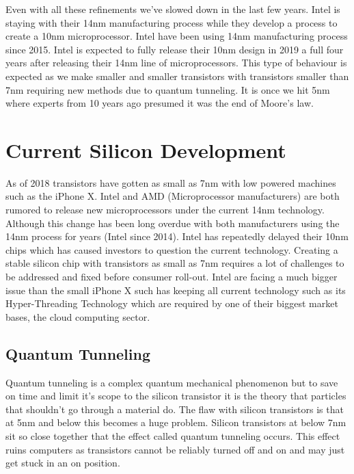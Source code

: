 \documentclass[journal]{IEEEtran}
\begin{document}
Even with all these refinements we've slowed down in the last few years. Intel is staying with their 14nm manufacturing process while they develop a process to create a 10nm microprocessor. Intel have been using 14nm manufacturing process since 2015. Intel is expected to fully release their 10nm design in 2019 a full four years after releasing their 14nm line of microprocessors. This type of behaviour is expected as we make smaller and smaller transistors with transistors smaller than 7nm requiring new methods due to quantum tunneling. It is once we hit 5nm where experts from 10 years ago presumed it was the end of Moore's law. \cite{591665}

\section{Current Silicon Development}
As of 2018 transistors have gotten as small as 7nm with low powered machines such as the iPhone X. Intel and AMD (Microprocessor manufacturers) are both rumored to release new microprocessors under the current 14nm technology. Although this change has been long overdue with both manufacturers using the 14nm process for years (Intel since 2014). Intel has repeatedly delayed their 10nm chips \cite{dent_2018} which has caused investors to question the current technology. Creating a stable silicon chip with transistors as small as 7nm requires a lot of challenges to be addressed and fixed before consumer roll-out. Intel are facing a much bigger issue than the small iPhone X such has keeping all current technology such as its Hyper-Threading Technology which are required by one of their biggest market bases, the cloud computing sector. 

\subsection{Quantum Tunneling}
Quantum tunneling is a complex quantum mechanical phenomenon \cite{70394920140101} but to save on time and limit it's scope to the silicon transistor it is the theory that particles that shouldn't go through a material do. The flaw with silicon transistors is that at 5nm and below this becomes a huge problem. Silicon transistors at below 7nm sit so close together that the effect called quantum tunneling occurs. This effect ruins computers as transistors cannot be reliably turned off and on and may just get stuck in an on position.
\end{document}
